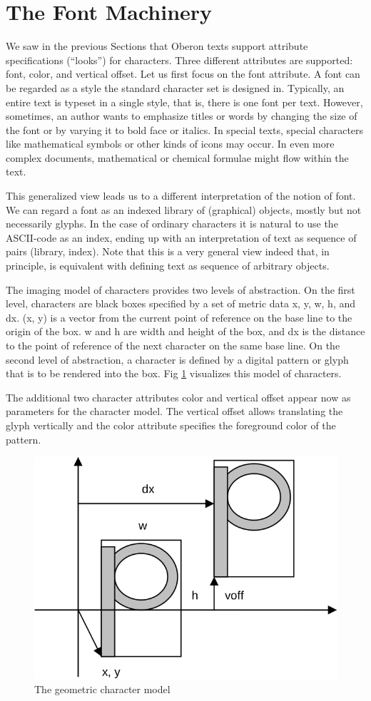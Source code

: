 \section{The Font Machinery}
\label{fontmachinery}
We saw in the previous Sections that Oberon texts support attribute specifications (“looks”) for
characters. Three different attributes are supported: font, color, and vertical offset. Let us first focus
on the font attribute. A font can be regarded as a style the standard character set is designed in.
Typically, an entire text is typeset in a single style, that is, there is one font per text. However,
sometimes, an author wants to emphasize titles or words by changing the size of the font or by
varying it to bold face or italics. In special texts, special characters like mathematical symbols or
other kinds of icons may occur. In even more complex documents, mathematical or chemical
formulae might flow within the text.

This generalized view leads us to a different interpretation of the notion of font. We can regard a
font as an indexed library of (graphical) objects, mostly but not necessarily glyphs. In the case of
ordinary characters it is natural to use the ASCII-code as an index, ending up with an interpretation
of text as sequence of pairs (library, index). Note that this is a very general view indeed that, in
principle, is equivalent with defining text as sequence of arbitrary objects.

The imaging model of characters provides two levels of abstraction. On the first level, characters
are black boxes specified by a set of metric data x, y, w, h, and dx. (x, y) is a vector from the current
point of reference on the base line to the origin of the box. w and h are width and height of the box,
and dx is the distance to the point of reference of the next character on the same base line. On the
second level of abstraction, a character is defined by a digital pattern or glyph that is to be rendered
into the box. Fig \ref{fig:character} visualizes this model of characters.

The additional two character attributes color and vertical offset appear now as parameters for the
character model. The vertical offset allows translating the glyph vertically and the color attribute
specifies the foreground color of the pattern.
\begin{figure}
  \label{fig:character}
  \centering
  \includegraphics[width=.7\textwidth]{i/i}
  \caption{The geometric character model}
\end{figure}

